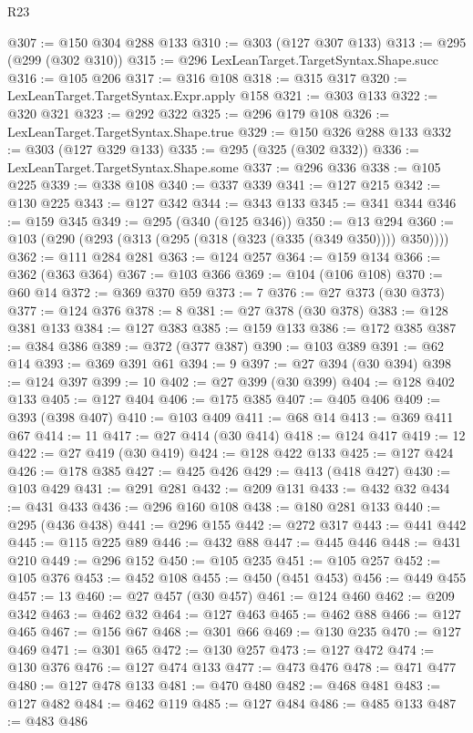 \begin{lexlean}{R23}
\begin{coremodule}
@307 := @150 @304 @288 @133
@310 := @303 (@127 @307 @133)
@313 := @295 (@299 (@302 @310))
@315 := @296 LexLeanTarget.TargetSyntax.Shape.succ
@316 := @105 @206
@317 := @316 @108
@318 := @315 @317
@320 := LexLeanTarget.TargetSyntax.Expr.apply @158
@321 := @303 @133
@322 := @320 @321
@323 := @292 @322
@325 := @296 @179 @108
@326 := LexLeanTarget.TargetSyntax.Shape.true
@329 := @150 @326 @288 @133
@332 := @303 (@127 @329 @133)
@335 := @295 (@325 (@302 @332))
@336 := LexLeanTarget.TargetSyntax.Shape.some
@337 := @296 @336
@338 := @105 @225
@339 := @338 @108
@340 := @337 @339
@341 := @127 @215
@342 := @130 @225
@343 := @127 @342
@344 := @343 @133
@345 := @341 @344
@346 := @159 @345
@349 := @295 (@340 (@125 @346))
@350 := @13 @294
@360 := @103 (@290 (@293 (@313 (@295 (@318 (@323 (@335 (@349 @350)))) @350))))
@362 := @111 @284 @281
@363 := @124 @257
@364 := @159 @134
@366 := @362 (@363 @364)
@367 := @103 @366
@369 := @104 (@106 @108)
@370 := @60 @14
@372 := @369 @370 @59
@373 := 7
@376 := @27 @373 (@30 @373)
@377 := @124 @376
@378 := 8
@381 := @27 @378 (@30 @378)
@383 := @128 @381 @133
@384 := @127 @383
@385 := @159 @133
@386 := @172 @385
@387 := @384 @386
@389 := @372 (@377 @387)
@390 := @103 @389
@391 := @62 @14
@393 := @369 @391 @61
@394 := 9
@397 := @27 @394 (@30 @394)
@398 := @124 @397
@399 := 10
@402 := @27 @399 (@30 @399)
@404 := @128 @402 @133
@405 := @127 @404
@406 := @175 @385
@407 := @405 @406
@409 := @393 (@398 @407)
@410 := @103 @409
@411 := @68 @14
@413 := @369 @411 @67
@414 := 11
@417 := @27 @414 (@30 @414)
@418 := @124 @417
@419 := 12
@422 := @27 @419 (@30 @419)
@424 := @128 @422 @133
@425 := @127 @424
@426 := @178 @385
@427 := @425 @426
@429 := @413 (@418 @427)
@430 := @103 @429
@431 := @291 @281
@432 := @209 @131
@433 := @432 @32
@434 := @431 @433
@436 := @296 @160 @108
@438 := @180 @281 @133
@440 := @295 (@436 @438)
@441 := @296 @155
@442 := @272 @317
@443 := @441 @442
@445 := @115 @225 @89
@446 := @432 @88
@447 := @445 @446
@448 := @431 @210
@449 := @296 @152
@450 := @105 @235
@451 := @105 @257
@452 := @105 @376
@453 := @452 @108
@455 := @450 (@451 @453)
@456 := @449 @455
@457 := 13
@460 := @27 @457 (@30 @457)
@461 := @124 @460
@462 := @209 @342
@463 := @462 @32
@464 := @127 @463
@465 := @462 @88
@466 := @127 @465
@467 := @156 @67
@468 := @301 @66
@469 := @130 @235
@470 := @127 @469
@471 := @301 @65
@472 := @130 @257
@473 := @127 @472
@474 := @130 @376
@476 := @127 @474 @133
@477 := @473 @476
@478 := @471 @477
@480 := @127 @478 @133
@481 := @470 @480
@482 := @468 @481
@483 := @127 @482
@484 := @462 @119
@485 := @127 @484
@486 := @485 @133
@487 := @483 @486

\end{coremodule}
\end{lexlean}
